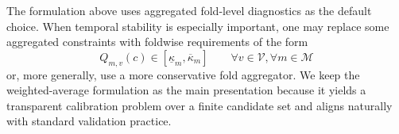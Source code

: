 \documentclass[12pt, draft]{article}
\theoremstyle{plain}
\theoremstyle{definition}
\newcommand{\1}{\mathbf{1}}
\begin{document}
{%

The formulation above uses aggregated fold-level diagnostics as the default choice. When temporal stability is especially important, one may replace some aggregated constraints with foldwise requirements of the form
\[
Q_{m,v}(c)\in[\underline{\kappa}_m,\overline{\kappa}_m]
\qquad
\forall v\in\mathcal V, \forall m \in \mathcal M
\]
or, more generally, use a more conservative fold aggregator. We keep the weighted-average formulation as the main presentation because it yields a transparent calibration problem over a finite candidate set and aligns naturally with standard validation practice.


}
\end{document}
